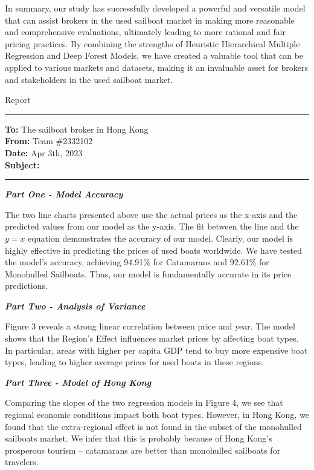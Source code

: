 \documentclass[12pt]{article}  %
\begin{document}
In summary, our study has successfully developed a powerful and versatile model that can assist brokers in the used sailboat market in making more reasonable and comprehensive evaluations, ultimately leading to more rational and fair pricing practices. By combining the strengths of Heuristic Hierarchical Multiple Regression and Deep Forest Models, we have created a valuable tool that can be applied to various markets and datasets, making it an invaluable asset for brokers and stakeholders in the used sailboat market.
\begin{letter}{Report}
\noindent\rule[0.25\baselineskip]{\textwidth}{2pt} 
\begin{flushleft}  %
\textbf{To:} The sailboat broker in Hong Kong\\
\textbf{From:} Team \#2332102\\
\textbf{Date:} Apr 3th, 2023\\
\textbf{Subject:} 
\noindent\rule[0.25\baselineskip]{\textwidth}{1pt}
\end{flushleft}

\noindent \textbf{\emph{Part One - Model Accuracy}}

The two line charts presented above use the actual prices as the x-axis and the predicted values from our model as the y-axis. The fit between the line and the $y=x$ equation demonstrates the accuracy of our model. Clearly, our model is highly effective in predicting the prices of used boats worldwide. We have tested the model's accuracy, achieving 94.91\% for Catamarans and 92.61\% for Monohulled Sailboats. Thus, our model is fundamentally accurate in its price predictions.

\noindent \textbf{\emph{Part Two - Analysis of Variance}}

Figure 3 reveals a strong linear correlation between price and year. The model shows that the Region's Effect influences market prices by affecting boat types. In particular, areas with higher per capita GDP tend to buy more expensive boat types, leading to higher average prices for used boats in these regions.

\noindent \textbf{\emph{Part Three - Model of Hong Kong}}

Comparing the slopes of the two regression models in Figure 4, we see that regional economic conditions impact both boat types. However, in Hong Kong, we found that the extra-regional effect is not found in the subset of the monohulled sailboats market. We infer that this is probably because of Hong Kong's prosperous tourism -- catamarans are better than monohulled sailboats for travelers.


\end{letter}
\end{document}
